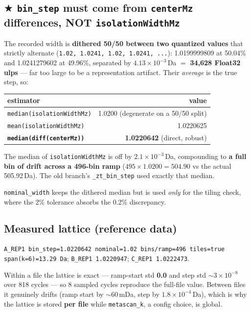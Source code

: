 \documentclass[11pt]{article}
\newcommand{\code}[1]{\texttt{\small #1}}
\begin{document}
\subsection*{$\bigstar$ \code{bin\_step} must come from \code{centerMz} differences, NOT \code{isolationWidthMz}}

The recorded width is \textbf{dithered 50/50 between two quantized values} that strictly alternate
(\code{1.02, 1.0241, 1.02, 1.0241, ...}): 1.0199999809 at 50.04\% and 1.0241279602 at 49.96\%,
separated by $4.13\times10^{-3}$\,Da $=$ \textbf{34,628 Float32 ulps} --- far too large to be a
representation artifact. Their \emph{average} is the true step, so:

\begin{center}
\begin{tabular}{lr}
\toprule
\textbf{estimator} & \textbf{value} \\
\midrule
\code{median(isolationWidthMz)} & 1.0200 \quad(degenerate on a 50/50 split) \\
\code{mean(isolationWidthMz)}   & 1.0220625 \\
\textbf{\code{median(diff(centerMz))}} & \textbf{1.0220642} \quad(direct, robust) \\
\bottomrule
\end{tabular}
\end{center}

The median of \code{isolationWidthMz} is off by $2.1\times10^{-3}$\,Da, compounding to \textbf{a
full bin of drift across a 496-bin ramp} ($495 \times 1.0200 = 504.90$ vs the actual
505.92\,Da). The old branch's \code{\_zt\_bin\_step} used exactly that median.

\code{nominal\_width} keeps the dithered median but is used \emph{only} for the tiling check,
where the 2\% tolerance absorbs the 0.2\% discrepancy.

\subsection*{Measured lattice (reference data)}

\code{A\_REP1 bin\_step=1.0220642  nominal=1.02  bins/ramp=496  tiles=true  span(k=6)=13.29 Da};
\code{B\_REP1 1.0220947}; \code{C\_REP1 1.0222473}.

Within a file the lattice is exact --- ramp-start std \textbf{0.0} and step std $\sim 3\times
10^{-8}$ over 818 cycles --- so 8 sampled cycles reproduce the full-file value. Between files it
genuinely drifts (ramp start by $\sim$60\,mDa, step by $1.8\times10^{-4}$\,Da), which is why the
lattice is stored \textbf{per file} while \code{metascan\_k}, a config choice, is global.
\end{document}
